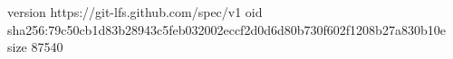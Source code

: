version https://git-lfs.github.com/spec/v1
oid sha256:79c50cb1d83b28943c5feb032002eccf2d0d6d80b730f602f1208b27a830b10e
size 87540
